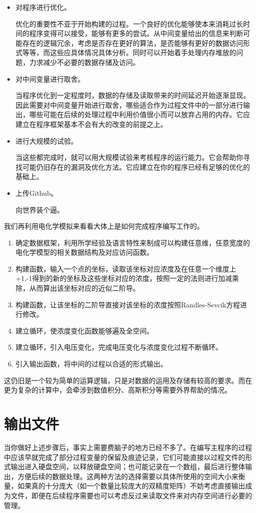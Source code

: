 \documentclass[12pt,a4paper]{article}
\begin{document}
\begin{itemize}
	\item 对程序进行优化。

	优化的重要性不亚于开始构建的过程。一个良好的优化能够使本来消耗过长时间的程序变得可以接受，能够有更多的尝试。从中间变量给出的信息来判断可能存在的逻辑冗余，考虑是否存在更好的算法，是否能够有更好的数据访问形式等等，而这些应具体情况具体分析。同时可以开始着手处理内存堆放的问题，力求减少不必要的数据存储及访问。

	\item 对中间变量进行取舍。

	当程序优化到一定程度时，数据的存储及读取带来的时间延迟开始逐渐显现。因此需要对中间变量开始进行取舍，哪些适合作为过程文件中的一部分进行输出，哪些可能在后续的处理过程中利用价值很小而可以放弃占用的内存。它应建立在程序框架基本不会有大的改变的前提之上。

	\item 进行大规模的试验。

	当这些都完成时，就可以用大规模试验来考核程序的运行能力。它会帮助你寻找可能仍旧存在的漏洞及优化方法。它应建立在你的程序已经有足够的优化的基础上。

	\item 上传Github。

	向世界装个逼。
\end{itemize}

我们再利用电化学模拟来看看大体上是如何完成程序编写工作的。

\begin{enumerate}
		\item 确定数据框架，利用所学经验及语言特性来制成可以构建任意维，任意宽度的电化学模型的相关数据结构及对应访问函数。
		\item 构建函数，输入一个点的坐标，读取该坐标对应浓度及在任意一个维度上+1,-1得到的新的坐标及这些坐标对应的浓度，按照一定的法则进行加减乘除，从而算出该坐标对应的近似二阶导。
		\item 构建函数，让该坐标的二阶导直接对该坐标的浓度按照Randles-Sevcik方程进行修改。
		\item 建立循环，使浓度变化函数能够遍及全空间。
		\item 建立循环，引入电压变化，完成电压变化与浓度变化过程不断循环。
		\item 引入输出函数，将中间的过程以合适的形式输出。
\end{enumerate}

这仍旧是一个较为简单的运算逻辑，只是对数据的运用及存储有较高的要求。而在更为复杂的计算中，会牵涉到数值积分、高斯积分等需要外界帮助的情况。


\section{输出文件}
当你做好上述步骤后，事实上需要费脑子的地方已经不多了。在编写主程序的过程中应该早就完成了部分过程变量的保留及痕迹记录，它们可能直接以过程文件的形式输出进入硬盘空间，以释放硬盘空间；也可能记录在一个数组，最后进行整体输出，方便后续的数据处理。这两种方法的选择需要以具体所使用的空间大小来衡量，如果真的十分庞大（如一个数量比较庞大的双精度矩阵）不妨考虑直接输出成为文件，即便在后续程序需要也可以考虑反过来读取文件来对内存空间进行必要的管理。
\end{document}
